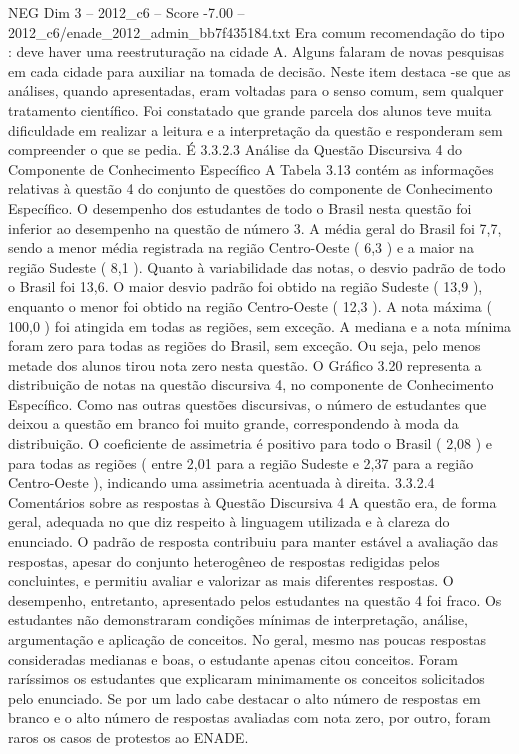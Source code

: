 \begin{textsample}{NEG Dim 3 – 2012\_c6 – Score -7.00 – 2012\_c6/enade\_2012\_admin\_bb7f435184.txt}
Era comum recomendação do tipo : deve haver uma reestruturação na cidade A.
Alguns falaram de novas pesquisas em cada cidade para auxiliar na tomada de decisão.
Neste item destaca -se que as análises, quando apresentadas, eram voltadas para o senso comum, sem qualquer tratamento científico.
Foi constatado que grande parcela dos alunos teve muita dificuldade em realizar a leitura e a interpretação da questão e responderam sem compreender o que se pedia.
É 3.3.2.3 Análise da Questão Discursiva 4 do Componente de Conhecimento Específico A Tabela 3.13 contém as informações relativas à questão 4 do conjunto de questões do componente de Conhecimento Específico.
O desempenho dos estudantes de todo o Brasil nesta questão foi inferior ao desempenho na questão de número 3.
A média geral do Brasil foi 7,7, sendo a menor média registrada na região Centro-Oeste ( 6,3 ) e a maior na região Sudeste ( 8,1 ).
Quanto à variabilidade das notas, o desvio padrão de todo o Brasil foi 13,6.
O maior desvio padrão foi obtido na região Sudeste ( 13,9 ), enquanto o menor foi obtido na região Centro-Oeste ( 12,3 ).
A nota máxima ( 100,0 ) foi atingida em todas as regiões, sem exceção.
A mediana e a nota mínima foram zero para todas as regiões do Brasil, sem exceção.
Ou seja, pelo menos metade dos alunos tirou nota zero nesta questão.
O Gráfico 3.20 representa a distribuição de notas na questão discursiva 4, no componente de Conhecimento Específico.
Como nas outras questões discursivas, o número de estudantes que deixou a questão em branco foi muito grande, correspondendo à moda da distribuição.
O coeficiente de assimetria é positivo para todo o Brasil ( 2,08 ) e para todas as regiões ( entre 2,01 para a região Sudeste e 2,37 para a região Centro-Oeste ), indicando uma assimetria acentuada à direita. 3.3.2.4 Comentários sobre as respostas à Questão Discursiva 4 A questão era, de forma geral, adequada no que diz respeito à linguagem utilizada e à clareza do enunciado.
O padrão de resposta contribuiu para manter estável a avaliação das respostas, apesar do conjunto heterogêneo de respostas redigidas pelos concluintes, e permitiu avaliar e valorizar as mais diferentes respostas.
O desempenho, entretanto, apresentado pelos estudantes na questão 4 foi fraco.
Os estudantes não demonstraram condições mínimas de interpretação, análise, argumentação e aplicação de conceitos.
No geral, mesmo nas poucas respostas consideradas medianas e boas, o estudante apenas citou conceitos.
Foram raríssimos os estudantes que explicaram minimamente os conceitos solicitados pelo enunciado.
Se por um lado cabe destacar o alto número de respostas em branco e o alto número de respostas avaliadas com nota zero, por outro, foram raros os casos de protestos ao ENADE.

\end{textsample}
